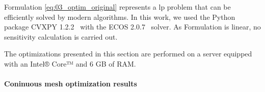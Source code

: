 Formulation \ref{eq:03_optim_original} represents a \gls{lp} problem that can be efficiently solved by modern algorithms. In this work, we used the Python package CVXPY 1.2.2~ with the ECOS 2.0.7~ solver. As Formulation is linear, no sensitivity calculation is carried out.

The optimizations presented in this section are performed on a server
equipped with an Intel® Core™ 
and 6 GB of RAM.

\paragraph{Coninuous mesh optimization results}
\begin{figure}[]
    \hfill
    \hfill
    \hfill

\end{figure}
